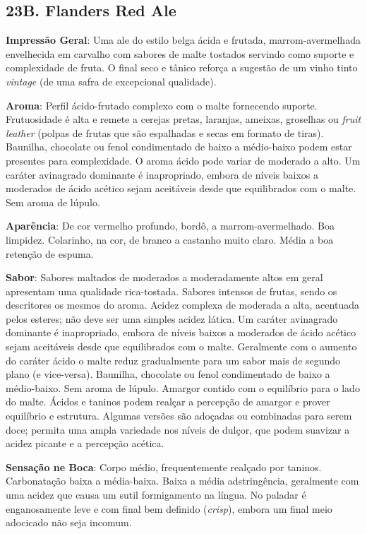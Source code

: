 \subsection*{23B. Flanders Red Ale}
\textbf{Impressão Geral}: Uma ale do estilo belga ácida e frutada, marrom-avermelhada envelhecida em carvalho com sabores de malte tostados servindo como suporte e complexidade de fruta. O final seco e tânico reforça a sugestão de um vinho tinto \textit{vintage} (de uma safra de excepcional qualidade).

\textbf{Aroma}: Perfil ácido-frutado complexo com o malte fornecendo suporte. Frutuosidade é alta e remete a cerejas pretas, laranjas, ameixas, groselhas ou \textit{fruit leather} (polpas de frutas que são espalhadas e secas em formato de tiras). Baunilha, chocolate ou fenol condimentado de baixo a médio-baixo podem estar presentes para complexidade. O aroma ácido pode variar de moderado a alto. Um caráter avinagrado dominante é inapropriado, embora de níveis baixos a moderados de ácido acético sejam aceitáveis desde que equilibrados com o malte. Sem aroma de lúpulo.

\textbf{Aparência}: De cor vermelho profundo, bordô, a marrom-avermelhado. Boa limpidez. Colarinho, na cor, de branco a castanho muito claro. Média a boa retenção de espuma.

\textbf{Sabor}: Sabores maltados de moderados a moderadamente altos em geral apresentam uma qualidade rica-tostada. Sabores intensos de frutas, sendo os descritores os mesmos do aroma. Acidez complexa de moderada a alta, acentuada pelos esteres; não deve ser uma simples acidez lática. Um caráter avinagrado dominante é inapropriado, embora de níveis baixos a moderados de ácido acético sejam aceitáveis desde que equilibrados com o malte. Geralmente com o aumento do caráter ácido o malte reduz gradualmente para um sabor mais de segundo plano (e vice-versa). Baunilha, chocolate ou fenol condimentado de baixo a médio-baixo. Sem aroma de lúpulo. Amargor contido com o equilíbrio para o lado do malte. Ácidos e taninos podem realçar a percepção de amargor e prover equilíbrio e estrutura. Algumas versões são adoçadas ou combinadas para serem doce; permita uma ampla variedade nos níveis de dulçor, que podem suavizar a acidez picante e a percepção acética.

\textbf{Sensação ne Boca}: Corpo médio, frequentemente realçado por taninos. Carbonatação baixa a média-baixa. Baixa a média adstringência, geralmente com uma acidez que causa um sutil formigamento na língua. No paladar é enganosamente leve e com final bem definido (\textit{crisp}), embora um final meio adocicado não seja incomum.

